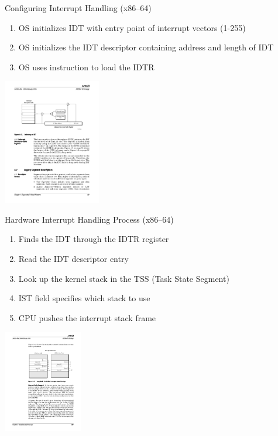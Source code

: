 \documentclass[11pt,aspectratio=169]{beamer}
\begin{document}
\begin{slide}{Configuring Interrupt Handling (x86--64)}
\begin{enumerate}
\item OS initializes IDT with entry point of interrupt vectors (1-255)
\item OS initializes the IDT descriptor containing address and length of IDT
\item OS uses  instruction to load the IDTR
\end{enumerate}
\centerline{
    \includegraphics[height=55mm]{idtr.pdf}
}
\end{slide}

\begin{slide}{Hardware Interrupt Handling Process (x86--64)}
\begin{enumerate}
\item Finds the IDT through the IDTR register
\item Read the IDT descriptor entry
\item Look up the kernel stack in the TSS (Task State Segment)
\item IST field specifies which stack to use
\item CPU pushes the interrupt stack frame
\end{enumerate}
\centerline{
    \includegraphics[height=45mm]{intstack.pdf}
}
\end{slide}
\end{document}
